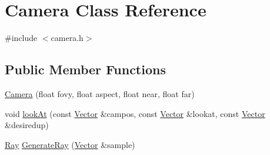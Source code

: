 \hypertarget{class_camera}{}\section{Camera Class Reference}
\label{class_camera}


{\ttfamily \#include $<$camera.\+h$>$}

\subsection*{Public Member Functions}
\begin{DoxyCompactItemize}
\item 
\mbox{\hyperlink{class_camera_aafce2ffd325ea7d8eb45076ba139ae17}{Camera}} (float fovy, float aspect, float near, float far)
\item 
void \mbox{\hyperlink{class_camera_afa27020f8305c918d9015bdebdb7437c}{look\+At}} (const \mbox{\hyperlink{struct_vector}{Vector}} \&campos, const \mbox{\hyperlink{struct_vector}{Vector}} \&lookat, const \mbox{\hyperlink{struct_vector}{Vector}} \&desiredup)
\item 
\mbox{\hyperlink{class_ray}{Ray}} \mbox{\hyperlink{class_camera_a154c1d086e33486104f1241692a5781c}{Generate\+Ray}} (\mbox{\hyperlink{struct_vector}{Vector}} \&sample)
\end{DoxyCompactItemize}
